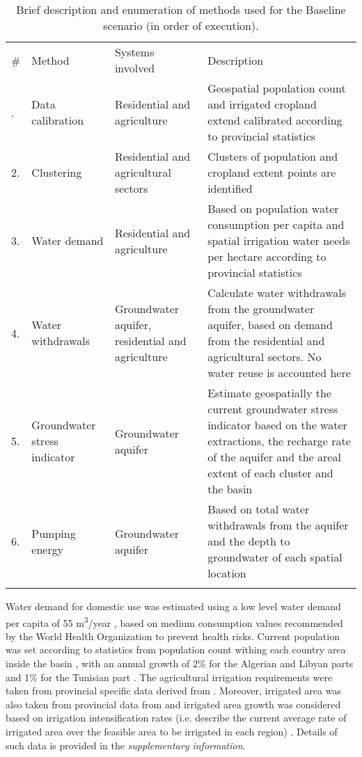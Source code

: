 \begin{table*}[!b]
    \caption{\label{tbl:methodsBaseline}Brief description and enumeration of methods used for the Baseline scenario (in order of execution).}
	\footnotesize
	\begin{tabular*}{\textwidth}{@{}l P{1.1in} P{1.2in} P{3.12in}}
		\br
		\# & Method & Systems involved & Description\\
		. & Data calibration & Residential and agriculture & Geospatial population count and irrigated cropland extend calibrated according to provincial statistics\\
	    2. & Clustering & Residential and agricultural sectors & Clusters of population and cropland extent points are identified\\
	    3. & Water demand & Residential and agriculture & Based on population water consumption per capita and spatial irrigation water needs per hectare according to provincial statistics \\
	    4. & Water withdrawals & Groundwater aquifer, residential and agriculture & Calculate water withdrawals from the groundwater aquifer, based on demand from the residential and agricultural sectors. No water reuse is accounted here\\
	    5. & Groundwater stress indicator & Groundwater aquifer & Estimate geospatially the current groundwater stress indicator based on the water extractions, the recharge rate of the aquifer and the areal extent of each cluster and the basin\\
	    6. & Pumping energy & Groundwater aquifer & Based on total water withdrawals from the aquifer and the depth to groundwater of each spatial location \\
		\br
	\end{tabular*}
\end{table*}

Water demand for domestic use was estimated using a low level water demand per capita of 55 m\textsuperscript{3}/year \cite{Householdwaterconsumption2014}, based on medium consumption values recommended by the World Health Organization to prevent health risks. Current population was set according to statistics from population count withing each country area inside the basin \cite{BetterValorizationIrrigation2015}, with an annual growth of 2\% for the Algerian and Libyan parts and 1\% for the Tunisian part \cite{uneceReconcilingResourceUses2020}. The agricultural irrigation requirements were taken from provincial specific data derived from \cite{Socioeconomicaspectsirrigation2014}. Moreover, irrigated area was also taken from provincial data from \cite{Socioeconomicaspectsirrigation2014,BetterValorizationIrrigation2015,almullaNWSAS} and irrigated area growth was considered based on irrigation intensification rates (i.e. describe the current average rate of irrigated area over the feasible area to be irrigated in each region) \cite{Socioeconomicaspectsirrigation2014}. Details of such data is provided in the \textit{supplementary information}.


